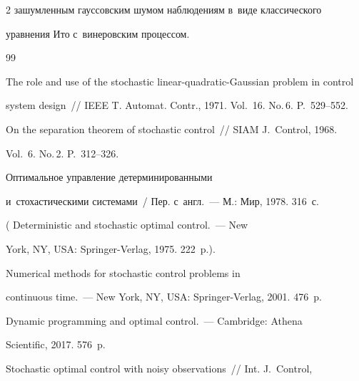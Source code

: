\begin{multicols}{2}
зашумленным гауссовским шумом наблюдениям в~виде классического 


уравнения Ито с~винеровским процессом.


     


{\small\frenchspacing


{%




\begin{thebibliography}{99}




 The role and use of the stochastic linear-quadratic-Gaussian problem in control 


system design~// IEEE T. Automat. Contr., 1971. Vol.~16. No.\,6. P.~529--552.




 On the separation theorem of stochastic control~// SIAM J.~Control, 1968. 


Vol.~6. No.\,2. P.~312--326.







 Оптимальное управление детерминированными 


и~стохастическими системами~/ Пер. с~англ.~--- М.: Мир, 1978. 316~с. 


( Deterministic and stochastic optimal control.~--- New 


York, NY, USA: Springer-Verlag, 1975. 222~p.).







 Numerical methods for stochastic control problems in 


continuous time.~--- New York, NY, USA: Springer-Verlag, 2001. 476~p.




 Dynamic programming and optimal control.~--- Cambridge: Athena 


Scientific, 2017. 576~p.







 Stochastic optimal control with noisy observations~// Int. J.~Control, 



\end{thebibliography}}}
\end{multicols}
